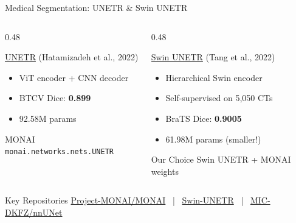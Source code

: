 \documentclass[aspectratio=169,xcolor=dvipsnames]{beamer}
\begin{document}
\begin{frame}{Medical Segmentation: UNETR \& Swin UNETR}
    \begin{columns}
        \begin{column}{0.48\textwidth}
            \begin{block}{\href{https://arxiv.org/abs/2103.10504}{UNETR} (Hatamizadeh et al., 2022)}
                \small
                \begin{itemize}\setlength{\itemsep}{1pt}
                    \item ViT encoder + CNN decoder
                    \item BTCV Dice: \textbf{0.899}
                    \item 92.58M params
                \end{itemize}
            \end{block}
            
            \begin{exampleblock}{ MONAI}
                \scriptsize \texttt{monai.networks.nets.UNETR}
            \end{exampleblock}
        \end{column}
        
        \begin{column}{0.48\textwidth}
            \begin{block}{\href{https://arxiv.org/abs/2201.01266}{Swin UNETR} (Tang et al., 2022)}
                \small
                \begin{itemize}\setlength{\itemsep}{1pt}
                    \item Hierarchical Swin encoder
                    \item Self-supervised on 5,050 CTs
                    \item BraTS Dice: \textbf{0.9005}
                    \item 61.98M params (smaller!)
                \end{itemize}
            \end{block}
            
            \begin{alertblock}{ Our Choice}
                \small Swin UNETR + MONAI weights
            \end{alertblock}
        \end{column}
    \end{columns}
    
    \vspace{0.3em}
    
    \begin{exampleblock}{ Key Repositories}
        \small
        \href{https://github.com/Project-MONAI/MONAI}{Project-MONAI/MONAI} ~|~ 
        \href{https://github.com/LeonidAlekseev/Swin-UNETR}{Swin-UNETR} ~|~
        \href{https://github.com/MIC-DKFZ/nnUNet}{MIC-DKFZ/nnUNet}
    \end{exampleblock}
\end{frame}
\end{document}
